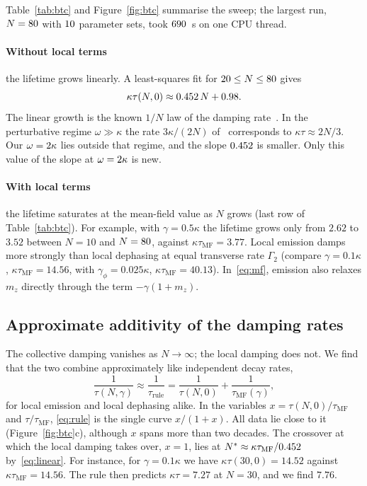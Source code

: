 \documentclass[11pt]{article}
\newcommand{\taumf}{\tau_{\mathrm{MF}}}
\newcommand{\taurule}{\tau_{\mathrm{rule}}}
\begin{document}
Table~\ref{tab:btc} and Figure~\ref{fig:btc} summarise the sweep; the largest run, $N=80$ with $10$ parameter
sets, took $690$~s on one CPU thread.

\paragraph{Without local terms} the lifetime grows linearly. A least-squares fit for $20\le N\le80$ gives
\begin{equation}\label{eq:linear}
  \kappa\tau(N,0)\approx0.452\,N+0.98 .
\end{equation}
The linear growth is the known $1/N$ law of the damping rate~\cite{liu2026,nemeth2025}. In the perturbative regime
$\omega\gg\kappa$ the rate $3\kappa/(2N)$ of~\cite{liu2026,nemeth2025} corresponds to $\kappa\tau\approx2N/3$. Our
$\omega=2\kappa$ lies outside that regime, and the slope $0.452$ is smaller. Only this value of the slope at
$\omega=2\kappa$ is new.

\paragraph{With local terms} the lifetime saturates at the mean-field value as $N$ grows (last row of
Table~\ref{tab:btc}). For example, with $\gamma=0.5\kappa$ the lifetime grows only from $2.62$ to $3.52$ between $N=10$
and $N=80$, against $\kappa\taumf=3.77$. Local emission damps more strongly than local dephasing at equal
transverse rate $\Gamma_2$ (compare $\gamma=0.1\kappa$, $\kappa\taumf=14.56$, with $\gamma_\phi=0.025\kappa$,
$\kappa\taumf=40.13$). In~\eqref{eq:mf}, emission also relaxes $m_z$ directly through the term $-\gamma(1+m_z)$.

\subsection{Approximate additivity of the damping rates}\label{sec:btc-rule}

The collective damping vanishes as $N\to\infty$; the local damping does not. We find that the two combine
approximately like independent decay rates,
\begin{equation}\label{eq:rule}
  \frac1{\tau(N,\gamma)}\approx\frac1{\taurule}=\frac1{\tau(N,0)}+\frac1{\taumf(\gamma)} ,
\end{equation}
for local emission and local dephasing alike. In the variables $x=\tau(N,0)/\taumf$ and $\tau/\taumf$,
\eqref{eq:rule} is the single curve $x/(1+x)$. All data lie close to it (Figure~\ref{fig:btc}c), although $x$ spans
more than two decades. The crossover at which the local damping takes over, $x=1$, lies at
$N^*\approx\kappa\taumf/\PMSlope$ by~\eqref{eq:linear}. For instance, for $\gamma=0.1\kappa$ we have $\kappa\tau(30,0)=14.52$
against $\kappa\taumf=14.56$. The rule then predicts $\kappa\tau=7.27$ at $N=30$, and we find $7.76$.
\end{document}
